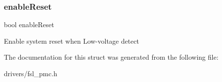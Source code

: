 \subsubsection{\texorpdfstring{enableReset}{enableReset}}
{\footnotesize\ttfamily bool enable\+Reset}

Enable system reset when Low-\/voltage detect 

The documentation for this struct was generated from the following file\+:\begin{DoxyCompactItemize}
\item 
drivers/fsl\+\_\+pmc.\+h\end{DoxyCompactItemize}
